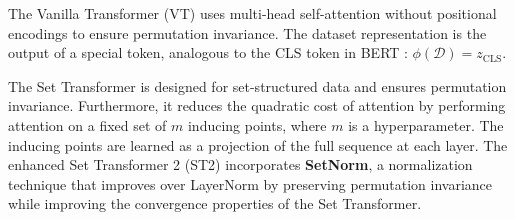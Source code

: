 The Vanilla Transformer (VT) \cite{NIPS2017_3f5ee243} uses multi-head self-attention without positional encodings to ensure permutation invariance. The dataset representation is the output of a special token, analogous to the CLS token in BERT \cite{devlin-etal-2019-bert}:
\(
\phi(\mathcal{D}) = z_{\text{CLS}}.
\)

The Set Transformer \cite{lee2019set} is designed for set-structured data and ensures permutation invariance. Furthermore, it reduces the quadratic cost of attention by performing attention on a fixed set of $m$ inducing points, where $m$ is a hyperparameter. The inducing points are learned as a projection of the full sequence at each layer. The enhanced Set Transformer 2 (ST2) \cite{zhang2022set} incorporates \textbf{SetNorm}, a normalization technique that improves over LayerNorm \cite{ba2016layer} by preserving permutation invariance while improving the convergence properties of the Set Transformer. 
